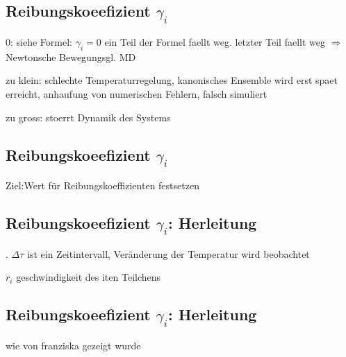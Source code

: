 \documentclass[twocolumn]{article}
\let\tempone\itemize
\let\temptwo\enditemize
\renewenvironment{itemize}{\tempone\addtolength{\itemsep}{-.5\baselineskip}}{\temptwo}
\begin{document}
\subsection{Reibungskoeefizient $\gamma_i$} 
\begin{itemize}
	\item 0: siehe Formel: $\gamma_i=0$ ein Teil der Formel faellt weg. letzter Teil faellt weg  $\Rightarrow$ Newtonsche Bewegungsgl. MD %
	\item zu klein: schlechte Temperaturregelung, kanonisches Ensemble wird erst spaet erreicht, anhaufung von numerischen Fehlern, falsch simuliert
	\item zu gross: stoerrt Dynamik des Systems 
\end{itemize}

\subsection{Reibungskoeefizient $\gamma_i$} 
\begin{itemize}
	\item Ziel:Wert für Reibungskoeffizienten festsetzen
\end{itemize}

\subsection{Reibungskoeefizient $\gamma_i$: Herleitung} 
\begin{itemize}
	\item . $\Delta \tau$ ist ein Zeitintervall, Veränderung der Temperatur  wird beobachtet
	\item $\dot{r}_i$ geschwindigkeit des iten Teilchens
\end{itemize}

\subsection{Reibungskoeefizient $\gamma_i$: Herleitung} 
wie von franziska gezeigt wurde
\end{document}
